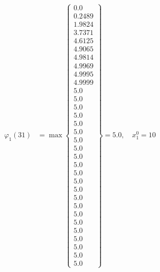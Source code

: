 \documentclass{article}
\begin{document}
\begin{align*}
  
\varphi_{1}(31) &= \max \left\{ \begin{array}{c}
0.0 \\
 0.2489 \\
 1.9824 \\
 3.7371 \\
 4.6125 \\
 4.9065 \\
 4.9814 \\
 4.9969 \\
 4.9995 \\
 4.9999 \\
 5.0 \\
 5.0 \\
 5.0 \\
 5.0 \\
 5.0 \\
 5.0 \\
 5.0 \\
 5.0 \\
 5.0 \\
 5.0 \\
 5.0 \\
 5.0 \\
 5.0 \\
 5.0 \\
 5.0 \\
 5.0 \\
 5.0 \\
 5.0 \\
 5.0 \\
 5.0 \\
 5.0 \\
 5.0
\end{array} \right\}=5.0,\quad x_{1}^0=10\\
  
  
  

\end{align*}
\end{document}
